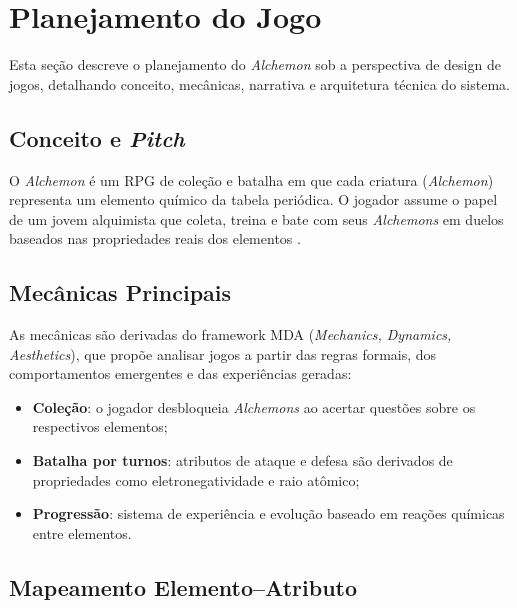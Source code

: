 
\section{Planejamento do Jogo}

Esta seção descreve o planejamento do \textit{Alchemon} sob a perspectiva de
design de jogos, detalhando conceito, mecânicas, narrativa e arquitetura
técnica do sistema.

\subsection{Conceito e \textit{Pitch}}

O \textit{Alchemon} é um RPG de coleção e batalha em que cada criatura
(\textit{Alchemon}) representa um elemento químico da tabela periódica. O
jogador assume o papel de um jovem alquimista que coleta, treina e bate com
seus \textit{Alchemons} em duelos baseados nas propriedades reais dos
elementos \cite{prensky2001digital}.

\subsection{Mecânicas Principais}

As mecânicas são derivadas do framework MDA (\textit{Mechanics, Dynamics,
Aesthetics}), que propõe analisar jogos a partir das regras formais, dos
comportamentos emergentes e das experiências geradas:

\begin{itemize}
    \item \textbf{Coleção}: o jogador desbloqueia \textit{Alchemons} ao
          acertar questões sobre os respectivos elementos;
    \item \textbf{Batalha por turnos}: atributos de ataque e defesa são
          derivados de propriedades como eletronegatividade e raio atômico;
    \item \textbf{Progressão}: sistema de experiência e evolução baseado
          em reações químicas entre elementos.
\end{itemize}


\subsection{Mapeamento Elemento–Atributo}

